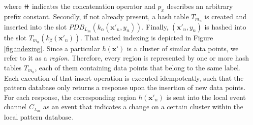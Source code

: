 where $\doubleplus$ indicates the concatenation operator and $p_x$ describes an arbitrary prefix constant. Secondly, if not already present, a hash table $T_{m_n}$ is created and inserted into the slot $PDB_{L_m}(k_\alpha(\bm{x}'_n, y_n))$. Finally, $(\bm{x}'_n, y_n)$ is hashed into the slot $T_{m_n}(k_\beta(\bm{x}'_n))$. That nested indexing is depicted in Figure \ref{fig:indexing}. Since a particular $h(\bm{x}')$ is a cluster of similar data points, we refer to it as a \textit{region}. Therefore, every region is represented by one or more hash tables $T_{m_n}$, each of them containing data points that belong to the same label. Each execution of that insert operation is executed idempotently, such that the pattern database only returns a response upon the insertion of new data points. For each response, the corresponding region $h(\bm{x}'_n)$ is sent into the local event channel $C_{L_m}$ as an event that indicates a change on a certain cluster within the local pattern database.